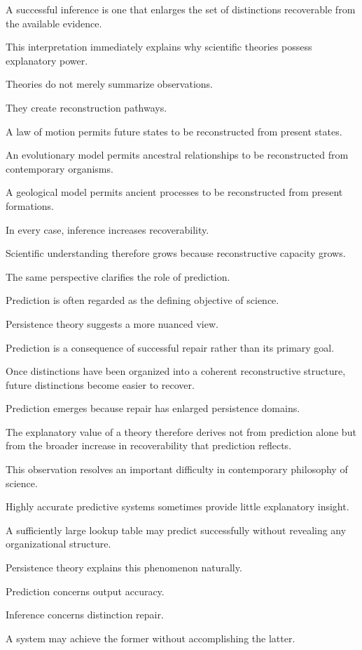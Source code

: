 \documentclass[12pt,oneside]{article}
\theoremstyle{definition}
\begin{document}
A successful inference is one that enlarges the set of distinctions recoverable from the available evidence.

This interpretation immediately explains why scientific theories possess explanatory power.

Theories do not merely summarize observations.

They create reconstruction pathways.

A law of motion permits future states to be reconstructed from present states.

An evolutionary model permits ancestral relationships to be reconstructed from contemporary organisms.

A geological model permits ancient processes to be reconstructed from present formations.

In every case, inference increases recoverability.

Scientific understanding therefore grows because reconstructive capacity grows.

The same perspective clarifies the role of prediction.

Prediction is often regarded as the defining objective of science.

Persistence theory suggests a more nuanced view.

Prediction is a consequence of successful repair rather than its primary goal.

Once distinctions have been organized into a coherent reconstructive structure, future distinctions become easier to recover.

Prediction emerges because repair has enlarged persistence domains.

The explanatory value of a theory therefore derives not from prediction alone but from the broader increase in recoverability that prediction reflects.

This observation resolves an important difficulty in contemporary philosophy of science.

Highly accurate predictive systems sometimes provide little explanatory insight.

A sufficiently large lookup table may predict successfully without revealing any organizational structure.

Persistence theory explains this phenomenon naturally.

Prediction concerns output accuracy.

Inference concerns distinction repair.

A system may achieve the former without accomplishing the latter.
\end{document}
